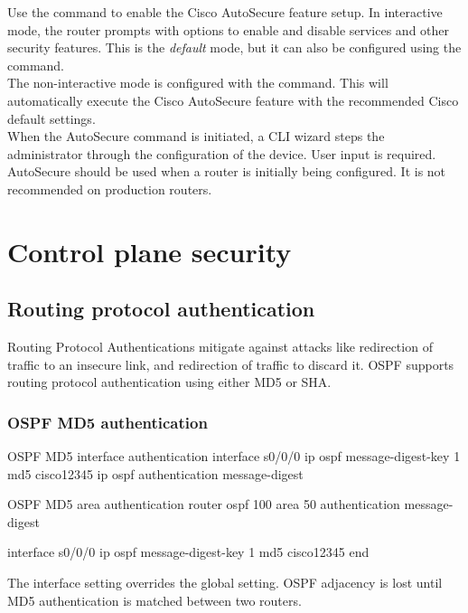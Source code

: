 Use the  command to enable the Cisco AutoSecure feature setup. In interactive mode, the router prompts with options to enable and disable services and other security features. This is the \emph{default} mode, but it can also be configured using the  command.\\

The non-interactive mode is configured with the  command. This will automatically execute the Cisco AutoSecure feature with the recommended Cisco default settings. \\

When the AutoSecure command is initiated, a CLI wizard steps the administrator through the configuration of the device. User input is required. AutoSecure should be used when a router is initially being configured. It is not recommended on production routers.

\section{Control plane security}

\subsection{Routing protocol authentication}

Routing Protocol Authentications mitigate against attacks like redirection of traffic to an insecure link, and redirection of traffic to discard it. OSPF supports routing protocol authentication using either MD5 or SHA.

\subsubsection{OSPF MD5 authentication}

\begin{sexylisting}{OSPF MD5 interface authentication}
interface s0/0/0
  ip ospf message-digest-key 1 md5 cisco12345
  ip ospf authentication message-digest
\end{sexylisting}

\begin{sexylisting}{OSPF MD5 area authentication}
router ospf 100
  area 50 authentication message-digest

interface s0/0/0
  ip ospf message-digest-key 1 md5 cisco12345
end
\end{sexylisting}

\note The interface setting overrides the global setting. OSPF adjacency is lost until MD5 authentication is matched between two routers.

